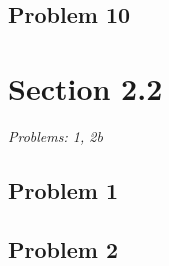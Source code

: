\documentclass[12pt]{article}
\begin{document}
\subsection*{Problem 10}


\vspace*{1cm}


\section*{Section 2.2}
\textit{Problems: 1, 2b}
\subsection*{Problem 1}
\subsection*{Problem 2}
\end{document}
